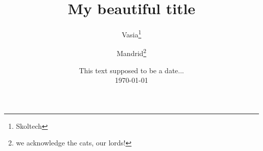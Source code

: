 \documentclass{article}
\title{My beautiful title}
\date{This text supposed to be a date...\\ \today}
\author{Vasia\thanks{Skoltech} \and Mandrid\thanks{we acknowledge the cats, our lords!}}
\begin{document}
\maketitle{}
\end{document}
